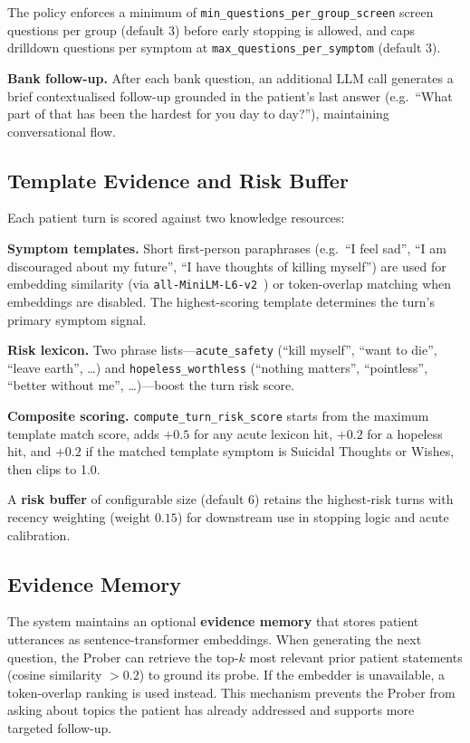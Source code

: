 \documentclass[]{ceurart}
\begin{document}
The policy enforces a minimum of \texttt{min\_questions\_per\_group\_screen} screen questions per group (default 3) before early stopping is allowed, and caps drilldown questions per symptom at \texttt{max\_questions\_per\_symptom} (default 3).

\textbf{Bank follow-up.}
After each bank question, an additional LLM call generates a brief contextualised follow-up grounded in the patient's last answer (e.g.\ ``What part of that has been the hardest for you day to day?''), maintaining conversational flow.


\subsection{Template Evidence and Risk Buffer}\label{sec:template}

Each patient turn is scored against two knowledge resources:

\textbf{Symptom templates.}
Short first-person paraphrases (e.g.\ ``I feel sad'', ``I am discouraged about my future'', ``I have thoughts of killing myself'') are used for embedding similarity (via \texttt{all-MiniLM-L6-v2}~\cite{Reimers2019sentencebert,Wang2020minilm}) or token-overlap matching when embeddings are disabled.
The highest-scoring template determines the turn's primary symptom signal.

\textbf{Risk lexicon.}
Two phrase lists---\texttt{acute\_safety} (``kill myself'', ``want to die'', ``leave earth'', \ldots) and \texttt{hopeless\_worthless} (``nothing matters'', ``pointless'', ``better without me'', \ldots)---boost the turn risk score.

\textbf{Composite scoring.}
\texttt{compute\_turn\_risk\_score} starts from the maximum template match score, adds $+0.5$ for any acute lexicon hit, $+0.2$ for a hopeless hit, and $+0.2$ if the matched template symptom is Suicidal Thoughts or Wishes, then clips to 1.0.

A \textbf{risk buffer} of configurable size (default 6) retains the highest-risk turns with recency weighting (weight $0.15$) for downstream use in stopping logic and acute calibration.


\subsection{Evidence Memory}\label{sec:memory}

The system maintains an optional \textbf{evidence memory} that stores patient utterances as sentence-transformer embeddings.
When generating the next question, the Prober can retrieve the top-$k$ most relevant prior patient statements (cosine similarity $> 0.2$) to ground its probe.
If the embedder is unavailable, a token-overlap ranking is used instead.
This mechanism prevents the Prober from asking about topics the patient has already addressed and supports more targeted follow-up.
\end{document}
